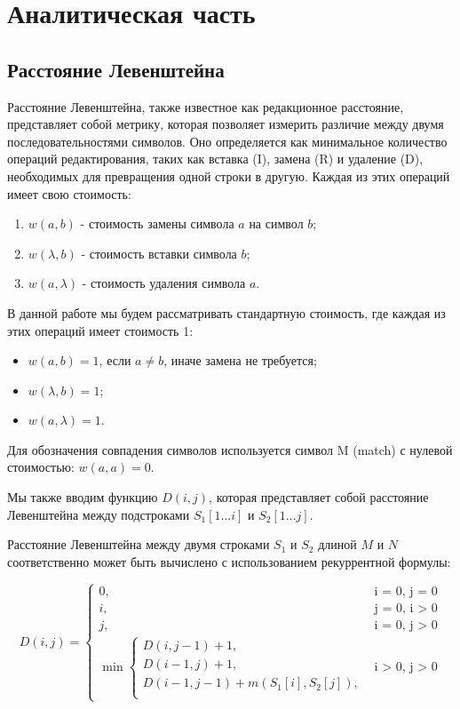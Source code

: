 \chapter{Аналитическая часть}

\section{Расстояние Левенштейна}

Расстояние Левенштейна, также известное как редакционное расстояние, представляет собой метрику, которая позволяет измерить различие между двумя последовательностями символов. 
Оно определяется как минимальное количество операций редактирования, таких как вставка (I), замена (R) и удаление (D), необходимых для превращения одной строки в другую. 
Каждая из этих операций имеет свою стоимость:

\begin{enumerate}[label=\arabic*)]
	\item $w(a, b)$ - стоимость замены символа $a$ на символ $b$;
	\item $w(\lambda, b)$ - стоимость вставки символа $b$;
	\item $w(a, \lambda)$ - стоимость удаления символа $a$.
\end{enumerate}

В данной работе мы будем рассматривать стандартную стоимость, где каждая из этих операций имеет стоимость 1:

\begin{itemize}[label=---]
	\item $w(a, b) = 1$, если $a \neq b$, иначе замена не требуется;
	\item $w(\lambda, b) = 1$;
	\item $w(a, \lambda) = 1$.
\end{itemize}

Для обозначения совпадения символов используется символ M (match) с нулевой стоимостью: $w(a, a) = 0$.

Мы также вводим функцию $D(i, j)$, которая представляет собой расстояние Левенштейна между подстроками $S_1[1...i]$ и $S_2[1...j]$.

Расстояние Левенштейна между двумя строками $S_1$ и $S_2$ длиной $M$ и $N$ соответственно может быть вычислено с использованием рекуррентной формулы:

\begin{equation}
	\label{eq:L}
	D(i, j) =
	\begin{cases}
		0, &\text{i = 0, j = 0}\\
		i, &\text{j = 0, i > 0}\\
		j, &\text{i = 0, j > 0}\\
		\min \begin{cases}
			D(i, j - 1) + 1,\\
			D(i - 1, j) + 1,\\
			D(i - 1, j - 1) +  m(S_{1}[i], S_{2}[j]), \\
		\end{cases}
		&\text{i > 0, j > 0}
	\end{cases}
\end{equation}

